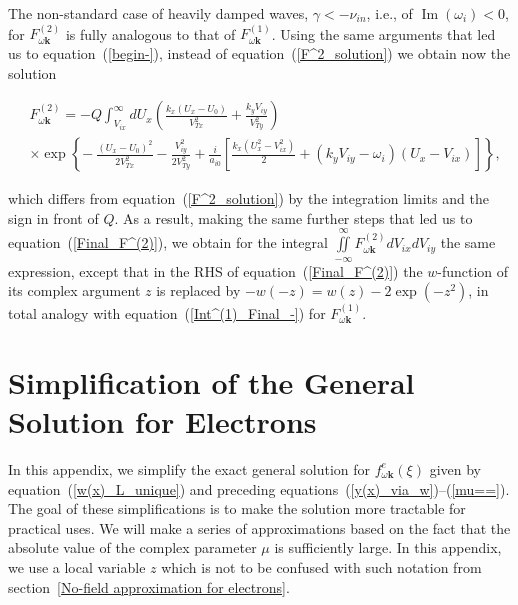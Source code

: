 \documentclass[draft]{agujournal2019}
\renewcommand{\vec}{\mathbf}
\begin{document}
{The non-standard case of heavily damped waves, $\gamma<-\nu_{in}$, i.e., of $\operatorname{Im}(\omega_i)<0$, 
for $F_{\omega\vec{k}}^{(2)}$ is fully analogous to that of $F_{\omega\vec{k}}^{(1)}$. 
Using the same arguments that led us to equation~(\ref{begin-}), instead 
of equation~(\ref{F^2_solution}) we obtain now the solution
\begin{linenomath*}
\begin{align*}
&  F_{\omega\vec{k}}^{(2)}=-Q\int_{V_{ix}}^{\infty}dU_{x}\left(  \frac
{k_{x}(U_{x}-U_{0})}{V_{Tx}^{2}}+\frac{k_{y}V_{iy}}{V_{Ty}^{2}%
}\right) \nonumber\\
&  \times\exp\left\{  -~\frac{(U_{x}-U_{0})^{2}}{2V_{Tx}^{2}}%
-\frac{V_{iy}^{2}}{2V_{Ty}^{2}}+\frac{i}{a_{i0}}\left[  \frac{k_{x}\left(
U_{x}^{2}-V_{ix}^{2}\right)  }{2}+(k_{y}V_{iy}-\omega_{i})\left(  U_{x}%
-V_{ix}\right)  \right]  \right\},
\end{align*}
\end{linenomath*}
which differs from equation~(\ref{F^2_solution}) by the integration limits and the sign in front of $Q$. 
As a result, making the same further steps that led us to equation~(\ref{Final_F^(2)}),
we obtain for the integral ${\iint\limits_{-\infty}^{\infty}}F_{\omega\vec{k}}^{(2)}dV_{ix}dV_{iy}$ 
the same expression, except that in the RHS of equation~(\ref{Final_F^(2)}) the $w$-function 
of its complex argument $z$ is replaced by $-w(-z)=w(z)-2\exp(-z^{2})$, 
in total analogy with equation~(\ref{Int^(1)_Final_-}) for $F_{\omega\vec{k}}^{(1)}$.


\section{Simplification of the General Solution for
Electrons\label{Simplification of the general solution for electrons}}

In this appendix, we simplify the exact general solution for $f_{\omega\vec{k}}^{e}(\xi)$ given by
equation~(\ref{w(x)_L_unique}) and preceding equations~(\ref{y(x)_via_w})--(\ref{mu==}). 
The goal of these simplifications is to make the solution more tractable for practical uses.
We will make a series of approximations based on the fact that the absolute value of the complex parameter $\mu$ is sufficiently large. 
In this appendix, we use a local variable $z$ which is not to be confused with such notation 
from section~\ref{No-field approximation for electrons}.

}
\end{document}
